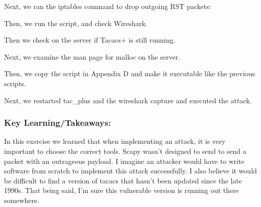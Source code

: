 \documentclass[main.tex]{subfiles}
\begin{document}

Next, we ran the iptables command to drop outgoing RST packets:


Then, we run the script, and check Wireshark.


Then we check on the server if Tacacs+ is still running.


Next, we examine the man page for malloc on the server.


Then, we copy the script in Appendix D and make it executable like the previous scripts.


Next, we restarted tac\_plus and the wireshark capture and executed the attack.


    
\subsubsection{Key Learning/Takeaways: }
In this exercise we learned that when implementing an attack, it is very important to choose the correct tools. Scapy wasn't designed to send to send a packet with an outrageous payload. I imagine an attacker would have to write software from scratch to implement this attack successfully. I also believe it would be difficult to find a version of tacacs that hasn't been updated since the late 1990s. That being said, I'm sure this vulnerable version is running out there somewhere. 
\end{document}

